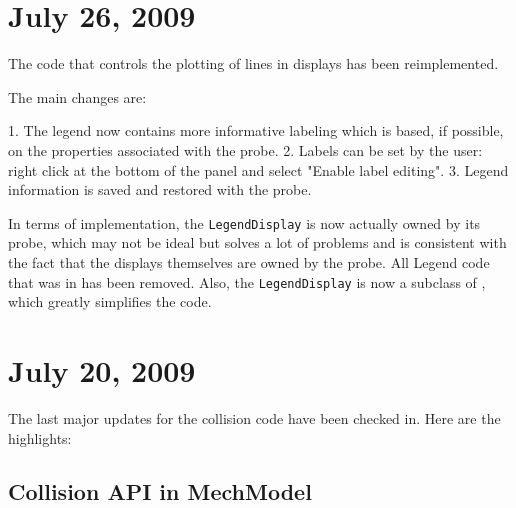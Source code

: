 \documentclass{article}
\begin{document}
\section*{July 26, 2009}

The  code that controls the 
plotting of lines in
displays has been reimplemented.

The main changes are:

   1. The legend now contains more informative labeling which is 
based, if possible, on the properties associated with the probe.
   2. Labels can be set by the user: right click at the bottom of 
the panel and select {\sf "Enable label editing"}.
   3. Legend information is saved and restored with the probe. 

In terms of implementation, the
{\tt LegendDisplay} is now actually owned 
by its probe, which may not be ideal but solves a lot of problems 
and is consistent with the fact that the displays themselves are owned 
by the probe. All Legend code that was in
 has been removed. 
Also, the {\tt LegendDisplay} is now a subclass 
of , which greatly simplifies 
the code.

\section*{July 20, 2009}

The last major updates for the collision code have been checked in. 
Here are the highlights:

\subsection*{Collision API in MechModel}
\end{document}
